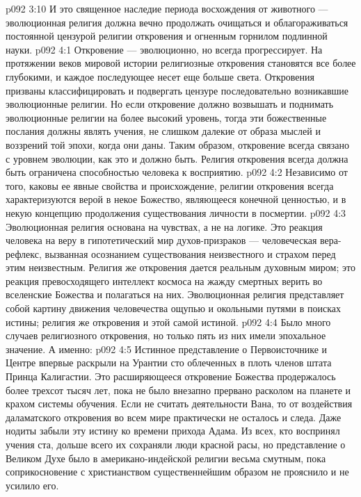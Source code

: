 \vs p092 3:10 И это священное наследие периода восхождения от животного --- эволюционная религия должна вечно продолжать очищаться и облагораживаться постоянной цензурой религии откровения и огненным горнилом подлинной науки.
\vs p092 4:1 Откровение --- эволюционно, но всегда прогрессирует. На протяжении веков мировой истории религиозные откровения становятся все более глубокими, и каждое последующее несет еще больше света. Откровения призваны классифицировать и подвергать цензуре последовательно возникавшие эволюционные религии. Но если откровение должно возвышать и поднимать эволюционные религии на более высокий уровень, тогда эти божественные послания должны являть учения, не слишком далекие от образа мыслей и воззрений той эпохи, когда они даны. Таким образом, откровение всегда связано с уровнем эволюции, как это и должно быть. Религия откровения всегда должна быть ограничена способностью человека к восприятию.
\vs p092 4:2 Независимо от того, каковы ее явные свойства и происхождение, религии откровения всегда характеризуются верой в некое Божество, являющееся конечной ценностью, и в некую концепцию продолжения существования личности в посмертии.
\vs p092 4:3 Эволюционная религия основана на чувствах, а не на логике. Это реакция человека на веру в гипотетический мир духов\hyp{}призраков --- человеческая вера\hyp{}рефлекс, вызванная осознанием существования неизвестного и страхом перед этим неизвестным. Религия же откровения дается реальным духовным миром; это реакция превосходящего интеллект космоса на жажду смертных верить во вселенские Божества и полагаться на них. Эволюционная религия представляет собой картину движения человечества ощупью и окольными путями в поисках истины; религия же откровения и  этой самой истиной.
\vs p092 4:4 \pc Было много случаев религиозного откровения, но только пять из них имели эпохальное значение. А именно:
\vs p092 4:5 \bibnobreakspace {} Истинное представление о Первоисточнике и Центре впервые раскрыли на Урантии сто облеченных в плоть членов штата Принца Калигастии. Это расширяющееся откровение Божества продержалось более трехсот тысяч лет, пока не было внезапно прервано расколом на планете и крахом системы обучения. Если не считать деятельности Вана, то от воздействия даламатского откровения во всем мире практически не осталось и следа. Даже нодиты забыли эту истину ко времени прихода Адама. Из всех, кто воспринял учения ста, дольше всего их сохраняли люди красной расы, но представление о Великом Духе было в американо\hyp{}индейской религии весьма смутным, пока соприкосновение с христианством существеннейшим образом не прояснило и не усилило его.
